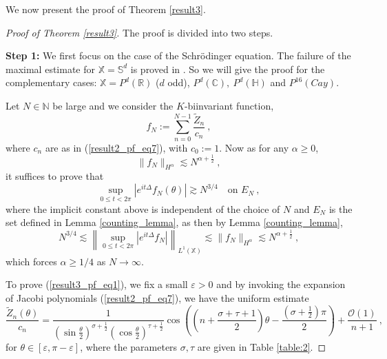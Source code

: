 \documentclass[12pt]{amsart}
\theoremstyle{definition}
\newcommand{\R}{\mathbb R}%
\newcommand{\C}{\mathbb C}%
\newcommand{\N}{\mathbb N}%
\newcommand{\Sb}{\mathbb S}%
\newcommand{\X}{\mathbb X}%
\newcommand{\Hb}{\mathbb H}%
\numberwithin{equation}{section}
\begin{document}
We now present the proof of Theorem \ref{result3}.
\begin{proof}[Proof of Theorem \ref{result3}]
The proof is divided into two steps.

{\bf Step 1:} We first focus on the case of the Schr\"odinger equation. The failure of the maximal estimate for $\X=\Sb^d$ is proved in \cite[Theorem 1.3]{CDLY}. So we will give the proof for the complementary cases: $\X=P^d(\R)$ ($d$ odd), $P^d(\C),\:P^d(\Hb)$ and $P^{16}(Cay)$.  

Let $N \in \N$ be large and we consider the $K$-biinvariant function,
\begin{equation*}
f_N:= \sum_{n=0}^{N-1} \frac{\tilde{Z}_n}{c_n}\:,
\end{equation*}
where $c_n$ are as in (\ref{result2_pf_eq7}), with $c_0:=1$. Now as for any $\alpha \ge 0$,
\begin{equation*}
\|f_N\|_{H^\alpha} \lesssim N^{\alpha +\frac{1}{2}}\:,
\end{equation*}
it suffices to prove that
\begin{equation} \label{result3_pf_eq1}
\sup_{0\le t <2\pi}\left| e^{it\Delta} f_N(\theta)\right| \gtrsim N^{3/4}\:\:\:\text{ on } E_N\:,
\end{equation}
where the implicit constant above is independent of the choice of $N$ and $E_N$ is the set defined in Lemma \ref{counting_lemma}, as then by Lemma \ref{counting_lemma},
\begin{equation*}
N^{3/4} \lesssim \left\|\sup_{0\le t <2\pi} \left| e^{it\Delta} f_N\right|\right\|_{L^1(\X)} \lesssim \|f_N\|_{H^\alpha} \lesssim N^{\alpha +\frac{1}{2}}\:,
\end{equation*}
which forces $\alpha \ge 1/4$ as $N \to \infty$.

To prove (\ref{result3_pf_eq1}), we fix a small $\varepsilon>0$ and by invoking the expansion of Jacobi polynomials (\ref{result2_pf_eq7}), we have the uniform estimate
\begin{equation*}
\frac{\tilde{Z}_n(\theta)}{c_n}=\frac{1}{\left(\sin\frac{\theta}{2}\right)^{\sigma+\frac{1}{2}}\left(\cos\frac{\theta}{2}\right)^{\tau+\frac{1}{2}}}\cos\left(\left(n+\frac{\sigma+\tau+1}{2}\right)\theta-\frac{\left(\sigma +\frac{1}{2}\right)\pi}{2}\right)+\frac{\mathcal{O}(1)}{n+1}\:,
\end{equation*}
for $\theta \in [\varepsilon,\pi-\varepsilon]$, where the parameters $\sigma, \tau$ are given in Table \ref{table:2}.


\end{proof}
\end{document}
